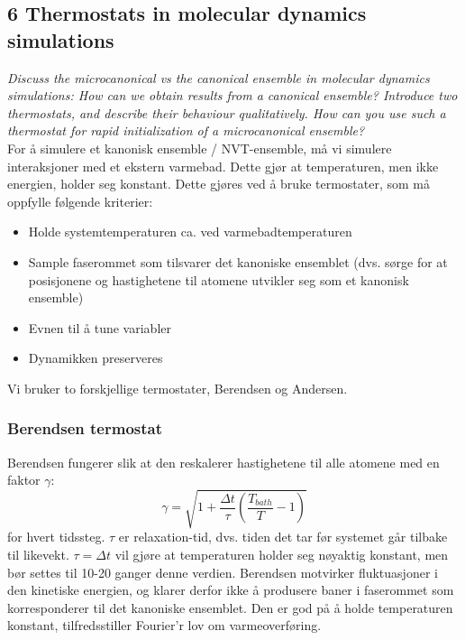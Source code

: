 \documentclass[english, a4paper]{article}
\begin{document}
\subsection{6 Thermostats in molecular dynamics simulations}
\textit{Discuss the microcanonical vs the canonical ensemble in molecular dynamics simulations:
How can we obtain results from a canonical ensemble? Introduce two thermostats, and describe their
behaviour qualitatively. How can you use such a thermostat for rapid initialization of a microcanonical
ensemble?} \\

\noindent
For å simulere et kanonisk ensemble / NVT-ensemble, må vi simulere interaksjoner med et 
ekstern varmebad. Dette gjør at temperaturen, men ikke energien, holder seg konstant. Dette gjøres ved
å bruke termostater, som må oppfylle følgende kriterier:
\begin{itemize}
 \item Holde systemtemperaturen ca. ved varmebadtemperaturen
 \item Sample faserommet som tilsvarer det kanoniske ensemblet (dvs. sørge for 
       at posisjonene og hastighetene til atomene utvikler seg som et kanonisk ensemble)
 \item Evnen til å tune variabler
 \item Dynamikken preserveres
\end{itemize}
Vi bruker to forskjellige termostater, Berendsen og Andersen. 

\subsubsection{Berendsen termostat}
Berendsen fungerer slik at den reskalerer hastighetene til alle atomene med en faktor $\gamma$:
\begin{equation}
 \gamma = \sqrt{1 + \frac{\Delta t}{\tau}\left(\frac{T_{bath}}{T} - 1\right)}
\end{equation}
for hvert tidssteg. $\tau$ er relaxation-tid, dvs. tiden det tar før systemet går tilbake til likevekt. 
$\tau = \Delta t$ vil gjøre at temperaturen holder seg nøyaktig konstant, men bør settes til 
10-20 ganger denne verdien. Berendsen motvirker fluktuasjoner i den kinetiske energien, og klarer derfor
ikke å produsere baner i faserommet som korresponderer til det kanoniske ensemblet. Den er god på å holde
temperaturen konstant, tilfredsstiller Fourier'r lov om varmeoverføring. 
\end{document}
